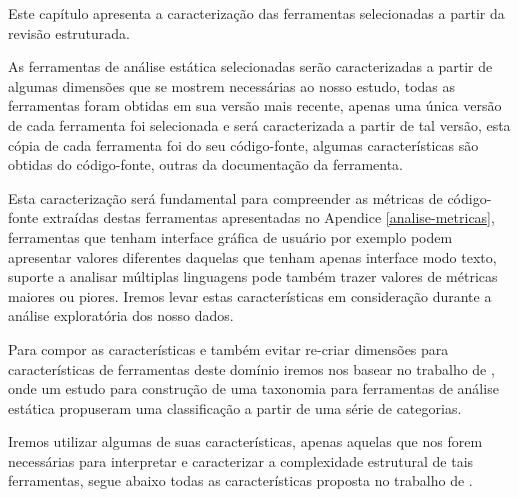 {Este capítulo apresenta a caracterização das ferramentas selecionadas a partir
da revisão estruturada.}
\label{caracterizacao-ferramentas}

As ferramentas de análise estática selecionadas serão caracterizadas
a partir de algumas dimensões que se mostrem necessárias ao nosso estudo, todas
as ferramentas foram obtidas em sua versão mais recente, apenas uma única versão
de cada ferramenta foi selecionada e será caracterizada a partir de tal versão,
esta cópia de cada ferramenta foi do seu código-fonte, algumas características
são obtidas do código-fonte, outras da documentação da ferramenta.

Esta caracterização será fundamental para compreender as métricas de código-fonte
extraídas destas ferramentas apresentadas no Apendice \ref{analise-metricas},
ferramentas que tenham interface gráfica de usuário por exemplo podem apresentar
valores diferentes daquelas que tenham apenas interface modo texto, suporte
a analisar múltiplas linguagens pode também trazer valores de métricas maiores ou
piores. Iremos levar estas características em consideração durante a análise
exploratória dos nosso dados.

Para compor as características e também evitar re-criar dimensões para características
de ferramentas deste domínio iremos nos basear no trabalho de
, onde um estudo para construção de uma taxonomia para
ferramentas de análise estática propuseram uma classificação a partir de uma
série de categorias.

Iremos utilizar algumas de suas características, apenas aquelas que nos forem necessárias
para interpretar e caracterizar a complexidade estrutural de tais ferramentas, segue abaixo todas
as características proposta no trabalho de .

